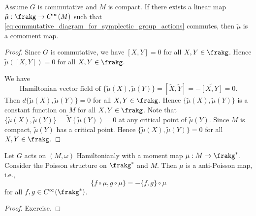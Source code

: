   \begin{lemma}
    Assume $G$ is commutative and $M$ is compact.
    If there exists a linear map $\tilde{\mu}: \frakg \to C^\infty(M)$ such that \cref{eq:commutative_diagram_for_symplectic_group_actions} commutes, then $\tilde{\mu}$ is a comoment map.
  \end{lemma}
  \begin{proof}
    Since $G$ is commutative, we have $[X, Y] = 0$ for all $X, Y \in \frakg$.
    Hence $\tilde{\mu}([X, Y]) = 0$ for all $X, Y \in \frakg$.

    We have 
    \[ \text{Hamiltonian vector field of } {\{\tilde{\mu}(X), \tilde{\mu}(Y)\}} = [\tilde{X}, \tilde{Y}] = -\widetilde{[X, Y]} = 0. \]
    Then $d \{\tilde{\mu}(X), \tilde{\mu}(Y)\} = 0$ for all $X, Y \in \frakg$.
    Hence $\{\tilde{\mu}(X), \tilde{\mu}(Y)\}$ is a constant function on $M$ for all $X, Y \in \frakg$.
    Note that $\{\tilde{\mu}(X), \tilde{\mu}(Y)\} = \tilde{X}(\tilde{\mu}(Y)) = 0$ at any critical point of $\tilde{\mu}(Y)$.
    Since $M$ is compact, $\tilde{\mu}(Y)$ has a critical point.
    Hence $\{\tilde{\mu}(X), \tilde{\mu}(Y)\} = 0$ for all $X, Y \in \frakg$.
  \end{proof}

  \begin{lemma}
    Let $G$ acts on $(M, \omega)$ Hamiltonianly with a moment map $\mu: M \to \frakg^*$.
    Consider the Poisson structure on $\frakg^*$ and $M$.
    Then $\mu$ is a anti-Poisson map, i.e., 
    \[ \{f \circ \mu, g \circ \mu\} = -\{f, g\} \circ \mu \]
    for all $f, g \in C^\infty(\frakg^*)$.
  \end{lemma}
  \begin{proof}
    Exercise.
  \end{proof}